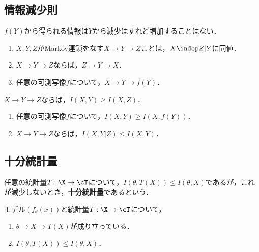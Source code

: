 \documentclass[uplatex,dvipdfmx]{jsreport}
\begin{document}
\subsection{情報減少則}

\begin{tcolorbox}[colframe=ForestGreen, colback=ForestGreen!10!white,breakable,colbacktitle=ForestGreen!40!white,coltitle=black,fonttitle=\bfseries\sffamily,
title=]
    $f(Y)$から得られる情報は$Y$から減少はすれど増加することはない．
\end{tcolorbox}

\begin{lemma}\mbox{}
    \begin{enumerate}
        \item $X,Y,Z$がMarkov連鎖をなす$X\to Y\to Z$ことは，$X\indep Z|Y$に同値．
        \item $X\to Y\to Z$ならば，$Z\to Y\to X$．
        \item 任意の可測写像$f$について，$X\to Y\to f(Y)$．
    \end{enumerate}
\end{lemma}

\begin{theorem}
    $X\to Y\to Z$ならば，$I(X,Y)\ge I(X,Z)$．
\end{theorem}
\begin{corollary}\mbox{}
    \begin{enumerate}
        \item 任意の可測写像$f$について，$I(X,Y)\ge I(X,f(Y))$．
        \item $X\to Y\to Z$ならば，$I(X,Y|Z)\le I(X,Y)$．
    \end{enumerate}
\end{corollary}

\subsection{十分統計量}

\begin{tcolorbox}[colframe=ForestGreen, colback=ForestGreen!10!white,breakable,colbacktitle=ForestGreen!40!white,coltitle=black,fonttitle=\bfseries\sffamily,
title=]
    任意の統計量$T:\X\to\cT$について，$I(\theta,T(X))\le I(\theta,X)$であるが，これが減少しないとき，\textbf{十分統計量}であるという．
\end{tcolorbox}

\begin{proposition}
    モデル$(f_\theta(x))$と統計量$T:\X\to\cT$について，
    \begin{enumerate}
        \item $\theta\to X\to T(X)$が成り立っている．
        \item $I(\theta,T(X))\le I(\theta,X)$．
    \end{enumerate}
\end{proposition}
\end{document}

